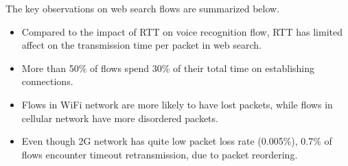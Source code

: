 The key observations on web search flows are summarized below.

\begin{itemize}
	\item Compared to the impact of RTT on voice recognition flow, RTT has limited affect on the transmission time per packet in web search.
	\item More than 50\% of flows spend 30\% of their total time on establishing connections.
	\item Flows in WiFi network are more likely to have lost packets, while flows in cellular network have more disordered packets.
	\item Even though 2G network has quite low packet loss rate (0.005\%), 0.7\% of flows encounter timeout retransmission, due to packet reordering.
\end{itemize}